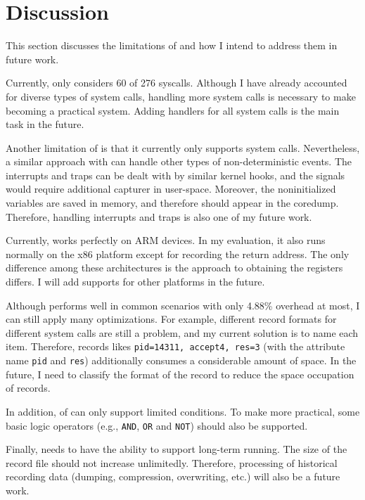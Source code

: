 \section{Discussion} \label{sec:discussion} 

This section discusses the limitations of \TheName and how I intend to address them in future work.

Currently, \TheName only considers 60 of 276 syscalls. Although I have already accounted for diverse types of system calls, handling more system calls is necessary to make \TheName becoming a practical system. Adding handlers for all system calls is the main task in the future.

Another limitation of \TheName is that it currently only supports system calls. Nevertheless, a similar approach with \TheName can handle other types of non-deterministic events. The
interrupts and traps can be dealt with by similar kernel hooks, and the signals
would require additional capturer in user-space. Moreover, the noninitialized variables are saved in memory, and therefore should appear in the coredump. Therefore, handling interrupts and traps is also one of my future work.

Currently, \TheName works perfectly on ARM devices. In my evaluation, it also runs normally on the x86 platform except for recording the return address. The only difference among these architectures is the approach to obtaining the registers differs. I will add supports for other platforms in the future.

Although \TheName performs well in common scenarios with only 4.88\% overhead at most, I can still apply many optimizations. For example, different record formats for different system calls are still a problem, and my current solution is to name each item. Therefore, records likes \texttt{pid=14311, accept4, res=3} (with the attribute name \texttt{pid} and \texttt{res}) additionally consumes a considerable amount of space. In the future, I need to classify the format of the record to reduce the space occupation of records.


In addition, \Filter of \TheName can only support limited conditions. To make \TheName more practical, some basic logic operators (e.g., \texttt{AND}, \texttt{OR} and \texttt{NOT}) should also be supported.

Finally, \TheName needs to have the ability to support long-term running. The size of the record file should not increase unlimitedly. Therefore, processing of historical recording data (dumping, compression, overwriting, etc.) will also be a future work.